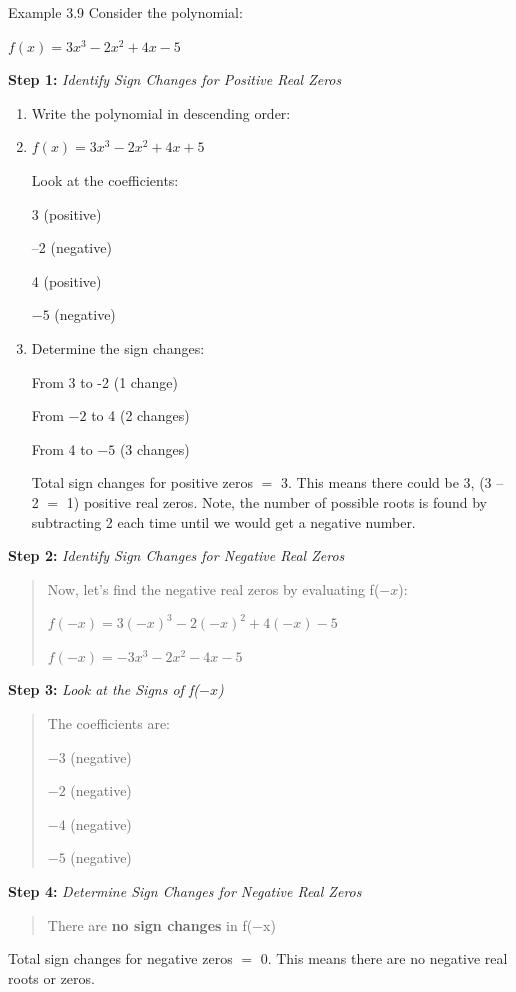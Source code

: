 \begin{example}{Example 3.9}
Consider the polynomial:

$f(x) = 3x^3 - 2x^2 + 4x - 5$

\solution
\textbf{Step 1:} \textit{Identify Sign Changes for Positive Real Zeros}
\begin{enumerate}
  \item Write the polynomial in descending order:
  \item $f(x) = 3x^3 - 2x^2 + 4x + 5$

  Look at the coefficients:

  3 (positive)

  --2 (negative)

  4 (positive)

  $-5$ (negative)
  \item Determine the sign changes:

  From 3 to -2 (1 change)

  From $-2$ to 4 (2 changes)

  From 4 to $-5$ (3 changes)

  Total sign changes for positive zeros $=$ 3. This means there could be 3,
  (3 -- 2 $=$ 1) positive real zeros. Note, the number of possible roots is found by
  subtracting 2 each time until we would get a negative number.
\end{enumerate}
\textbf{Step 2:} \textit{Identify Sign Changes for Negative Real Zeros}
\begin{quote}
Now, let's find the negative real zeros by evaluating f($-x$):

$f(-x) = 3(-x)^3 - 2(-x)^2 + 4(-x) - 5$

$f(-x) = -3x^3 - 2x^2 - 4x - 5$
\end{quote}
\textbf{Step 3:} \textit{Look at the Signs of f($-x$)}
\begin{quote}
The coefficients are:

$-3$ (negative)

$-2$ (negative)

$-4$ (negative)

$-5$ (negative)
\end{quote}
\textbf{Step 4:} \textit{Determine Sign Changes for Negative Real Zeros}
\begin{quote}
There are \textbf{no sign changes} in f($-$x)
\end{quote}
Total sign changes for negative zeros $=$ 0. This means there are no negative real
roots or zeros.
\end{example}

